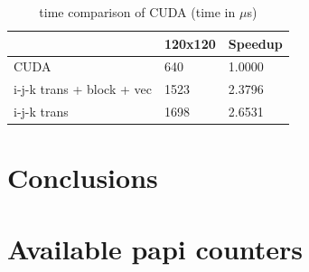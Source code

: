 \documentclass[a4paper]{report}
\begin{document}
\begin{table}[H]
\centering
\begin{tabular}{|l|l|l|}
\hline
                          & 120x120 & Speedup \\ \hline
CUDA                      & 640     & 1.0000  \\ \hline
i-j-k trans + block + vec & 1523    & 2.3796  \\ \hline
i-j-k trans               & 1698    & 2.6531  \\ \hline
\end{tabular}
\caption{time comparison of CUDA (time in $\mu$s)}
\end{table}


\chapter{Conclusions}


\appendix

\chapter{Available papi counters}\label{A:papi_avail}

\end{document}
